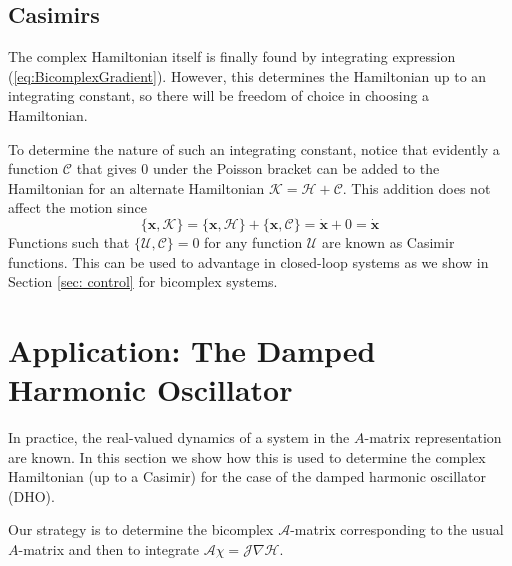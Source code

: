 \documentclass{article}
\begin{document}
 \subsection{Casimirs}
\label{sec:Casimirs}
The complex Hamiltonian itself is finally found by integrating  expression (\ref{eq:BicomplexGradient}).  However, this determines the Hamiltonian up to an integrating constant, so there will be freedom of choice in choosing a Hamiltonian.  

To determine the nature of such an integrating constant, notice that
evidently a  function $\mathcal{C}$ that gives 0 under the Poisson bracket can be added to the Hamiltonian for an alternate Hamiltonian $\mathcal{K} = \mathcal{H} + \mathcal{C}$.
This addition does not affect the motion since
\begin{equation}
    \{\textbf{x},\mathcal{K}\} = \{\textbf{x},\mathcal{H}\} 
    + \{\textbf{x}, \mathcal{C}\} = \dot{\textbf{x}} + 0 = \dot{\textbf{x}}
\end{equation}
Functions such that $\{ \mathcal{U},\mathcal{C} \} = 0$  for any  function $\mathcal{U}$ are known as Casimir functions. This can be used to advantage in closed-loop systems as we show in Section \ref{sec: control} for bicomplex systems. 


\section{Application: The Damped Harmonic Oscillator}
\label{sec: dho}
In practice, the real-valued dynamics of a system in the $A$-matrix representation are known. 
In this section we show how this is used to determine the complex Hamiltonian (up to a Casimir) for the case of the damped harmonic oscillator (DHO).  

Our strategy is to determine the bicomplex $\mathcal{A}$-matrix corresponding to the usual $A$-matrix and then to integrate $\mathcal{A}\chi = \mathcal{J}\nabla \mathcal{H}$.

\end{document}
